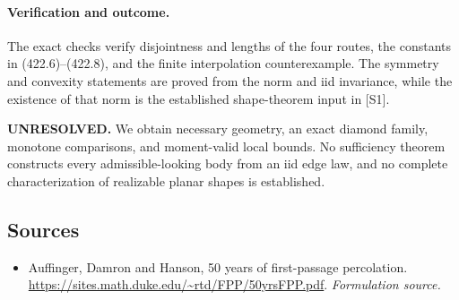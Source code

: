 \documentclass[11pt]{article}
\begin{document}
\paragraph{Verification and outcome.}
The exact checks verify disjointness and lengths of the four routes, the constants in (422.6)--(422.8), and the finite interpolation counterexample. The symmetry and convexity statements are proved from the norm and iid invariance, while the existence of that norm is the established shape-theorem input in [S1].

\textbf{UNRESOLVED.} We obtain necessary geometry, an exact diamond family, monotone comparisons, and moment-valid local bounds. No sufficiency theorem constructs every admissible-looking body from an iid edge law, and no complete characterization of realizable planar shapes is established.

\subsection{Sources}
\begin{itemize}
\item[S1]Auffinger, Damron and Hanson, 50 years of first-passage percolation.
\url{https://sites.math.duke.edu/~rtd/FPP/50yrsFPP.pdf}.
\textit{Formulation source.}
\end{itemize}
\end{document}
